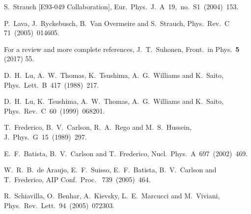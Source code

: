 \documentclass[preprint,aps,showpacs,floatfix]{revtex4}
\begin{document}
\begin{thebibliography}{99}
  
    S.~Strauch [E93-049 Collaboration],
  Eur.\ Phys.\ J.\ A~19,~no.~S1~(2004)~153.   %
  
  
  P.~Lava, J.~Ryckebusch, B.~Van Overmeire and S.~Strauch,
  Phys.\ Rev.\ C 71~(2005)~014605.    %

  For a review and more complete references, J.~T.~Suhonen,
  Front.\ in Phys.\  {\bf 5} (2017) 55.


  

  D.~H.~Lu, A.~W.~Thomas, K.~Tsushima, A.~G.~Williams and K.~Saito,
  Phys.\ Lett.\ B~417~(1988)~217.   %
  
  D.~H.~Lu, K.~Tsushima, A.~W.~Thomas, A.~G.~Williams and K.~Saito,
  Phys.\ Rev.\ C~60~(1999)~068201.   %


  T.~Frederico, B.~V.~Carlson, R.~A.~Rego and M.~S.~Hussein,
  J.~Phys.~G~15~(1989)~297.  
  
  E.~F.~Batista, B.~V.~Carlson and T.~Frederico,
  Nucl.\ Phys.\ A~697~(2002)~469. %
  
  
  W.~R.~B.~de Araujo, E.~F.~Suisso, E.~F.~Batista, B.~V.~Carlson and T.~Frederico,
  AIP Conf.\ Proc. \ 739~(2005)~464.    %
  
  R.~Schiavilla, O.~Benhar, A.~Kievsky, L.~E.~Marcucci and M.~Viviani,
  Phys.~Rev.~Lett.~94~(2005)~072303.  %
  


\end{thebibliography}
\end{document}
